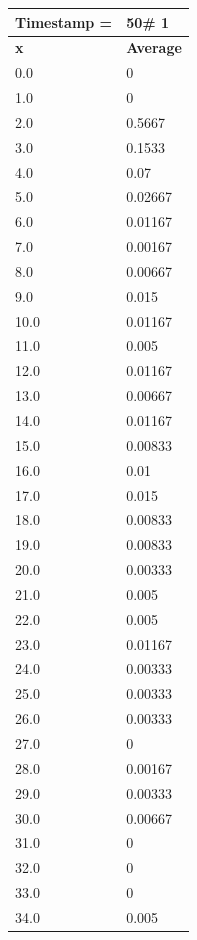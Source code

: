 \begin{tabular}{|l||l|}
\hline
\textbf{Timestamp =} & \textbf{50}\# 1\\\hline
	\textbf{x} & \textbf{Average} \\ \hline
\hline
	0.0 & 0 \\ \hline
	1.0 & 0 \\ \hline
	2.0 & 0.5667 \\ \hline
	3.0 & 0.1533 \\ \hline
	4.0 & 0.07 \\ \hline
	5.0 & 0.02667 \\ \hline
	6.0 & 0.01167 \\ \hline
	7.0 & 0.00167 \\ \hline
	8.0 & 0.00667 \\ \hline
	9.0 & 0.015 \\ \hline
	10.0 & 0.01167 \\ \hline
	11.0 & 0.005 \\ \hline
	12.0 & 0.01167 \\ \hline
	13.0 & 0.00667 \\ \hline
	14.0 & 0.01167 \\ \hline
	15.0 & 0.00833 \\ \hline
	16.0 & 0.01 \\ \hline
	17.0 & 0.015 \\ \hline
	18.0 & 0.00833 \\ \hline
	19.0 & 0.00833 \\ \hline
	20.0 & 0.00333 \\ \hline
	21.0 & 0.005 \\ \hline
	22.0 & 0.005 \\ \hline
	23.0 & 0.01167 \\ \hline
	24.0 & 0.00333 \\ \hline
	25.0 & 0.00333 \\ \hline
	26.0 & 0.00333 \\ \hline
	27.0 & 0 \\ \hline
	28.0 & 0.00167 \\ \hline
	29.0 & 0.00333 \\ \hline
	30.0 & 0.00667 \\ \hline
	31.0 & 0 \\ \hline
	32.0 & 0 \\ \hline
	33.0 & 0 \\ \hline
	34.0 & 0.005 \\ \hline
\end{tabular}

